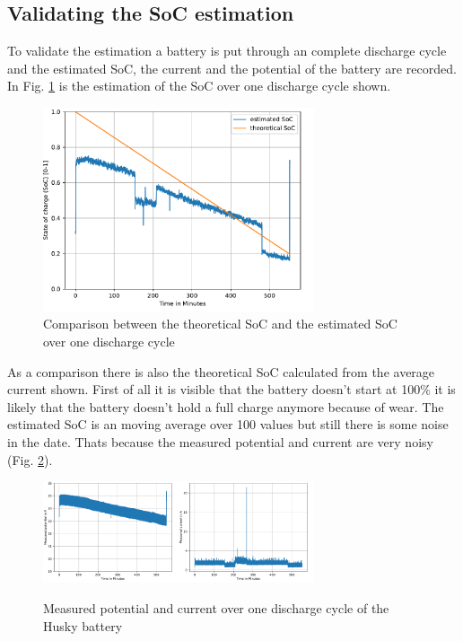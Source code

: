 \documentclass[conference]{IEEEtran}
\begin{document}
\subsection{Validating the SoC estimation}
To validate the estimation a battery is put through an complete discharge cycle and the estimated SoC, the current and the potential of the battery are recorded.
In Fig. \ref{fig:SoCUeberZeit} is the estimation of the SoC over one discharge cycle shown.
\begin{figure}[htbp]
    \centerline{\includegraphics[width=8cm]{Pictures/SoCUeberZeit.pdf}}
    \caption{Comparison between the theoretical SoC and the estimated SoC over one discharge cycle}
    \label{fig:SoCUeberZeit}
\end{figure}
As a comparison there is also the theoretical SoC calculated from the average current shown.
First of all it is visible that the battery doesn't start at 100\% it is likely that the battery doesn't hold a full charge anymore because of wear.
The estimated SoC is an moving average over 100 values but still there is some noise in the date. Thats because the measured potential and current are very noisy (Fig. \ref{fig:SpannungStromUeberZeit}).
\begin{figure}[htbp]
    \centerline{\includegraphics[width=4cm]{Pictures/SpannungUeberZeit.pdf}\includegraphics[width=4cm]{Pictures/StormUeberZeit.pdf}}
    \caption{Measured potential and current over one discharge cycle of the Husky battery}
    \label{fig:SpannungStromUeberZeit}
\end{figure}
\end{document}
